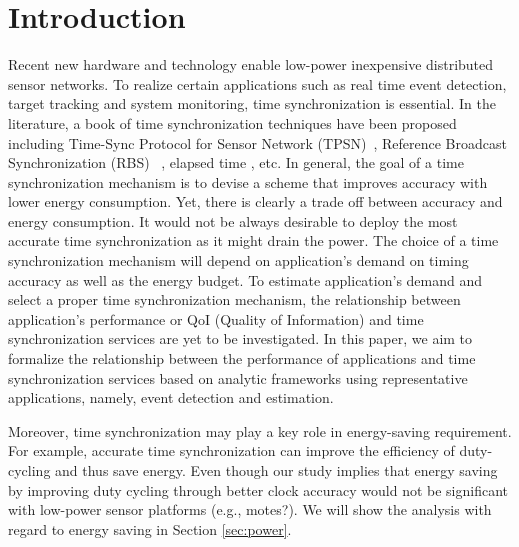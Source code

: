 \section{Introduction}
Recent new hardware and technology enable low-power inexpensive
distributed sensor networks. To realize certain applications such as
real time event detection, target tracking and system monitoring,
time synchronization is essential. In the literature, a book of time
synchronization techniques have been proposed including Time-Sync
Protocol for Sensor Network (TPSN)~\cite{ganeriwal03timingsync},
Reference Broadcast Synchronization (RBS)
~\cite{elson02finegrained}, elapsed time \cite{kusy05elapsed}, etc.
In general, the goal of a time synchronization mechanism is to
devise a scheme that improves accuracy with lower energy
consumption. Yet, there is clearly a trade off between accuracy and
energy consumption. It would not be always desirable to deploy the
most accurate time synchronization as it might drain the power. The
choice of a time synchronization mechanism will depend on
application's demand on timing accuracy as well as the energy
budget. To estimate application's demand and select a proper time
synchronization mechanism, the relationship between application's
performance or QoI (Quality of Information) and time synchronization
services are yet to be investigated. In this paper, we aim to
formalize the relationship between the performance of applications
and time synchronization services based on analytic frameworks using
representative applications, namely, event detection and estimation.


Moreover, time synchronization may play a key role in energy-saving
requirement. For example, accurate time synchronization can improve
the efficiency of duty-cycling and thus save energy.
Even though our study implies that energy saving by improving duty
cycling through better clock accuracy would not be significant with
low-power sensor platforms (e.g., motes?). We will show the analysis
with regard to energy saving in Section \ref{sec:power}.

